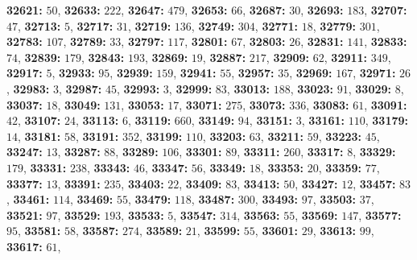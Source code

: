 \textsf{\bfseries 32621:} $50$, \textsf{\bfseries 32633:} $222$, \textsf{\bfseries 32647:} $479$, \textsf{\bfseries 32653:} $66$, \textsf{\bfseries 32687:} $30$, \textsf{\bfseries 32693:} $183$, \textsf{\bfseries 32707:} $47$, \textsf{\bfseries 32713:} $5$, \textsf{\bfseries 32717:} $31$, \textsf{\bfseries 32719:} $136$, \textsf{\bfseries 32749:} $304$, \textsf{\bfseries 32771:} $18$, \textsf{\bfseries 32779:} $301$, \textsf{\bfseries 32783:} $107$, \textsf{\bfseries 32789:} $33$, \textsf{\bfseries 32797:} $117$, \textsf{\bfseries 32801:} $67$, \textsf{\bfseries 32803:} $26$, \textsf{\bfseries 32831:} $141$, \textsf{\bfseries 32833:} $74$, \textsf{\bfseries 32839:} $179$, \textsf{\bfseries 32843:} $193$, \textsf{\bfseries 32869:} $19$, \textsf{\bfseries 32887:} $217$, \textsf{\bfseries 32909:} $62$, \textsf{\bfseries 32911:} $349$, \textsf{\bfseries 32917:} $5$, \textsf{\bfseries 32933:} $95$, \textsf{\bfseries 32939:} $159$, \textsf{\bfseries 32941:} $55$, \textsf{\bfseries 32957:} $35$, \textsf{\bfseries 32969:} $167$, \textsf{\bfseries 32971:} $26$, \textsf{\bfseries 32983:} $3$, \textsf{\bfseries 32987:} $45$, \textsf{\bfseries 32993:} $3$, \textsf{\bfseries 32999:} $83$, \textsf{\bfseries 33013:} $188$, \textsf{\bfseries 33023:} $91$, \textsf{\bfseries 33029:} $8$, \textsf{\bfseries 33037:} $18$, \textsf{\bfseries 33049:} $131$, \textsf{\bfseries 33053:} $17$, \textsf{\bfseries 33071:} $275$, \textsf{\bfseries 33073:} $336$, \textsf{\bfseries 33083:} $61$, \textsf{\bfseries 33091:} $42$, \textsf{\bfseries 33107:} $24$, \textsf{\bfseries 33113:} $6$, \textsf{\bfseries 33119:} $660$, \textsf{\bfseries 33149:} $94$, \textsf{\bfseries 33151:} $3$, \textsf{\bfseries 33161:} $110$, \textsf{\bfseries 33179:} $14$, \textsf{\bfseries 33181:} $58$, \textsf{\bfseries 33191:} $352$, \textsf{\bfseries 33199:} $110$, \textsf{\bfseries 33203:} $63$, \textsf{\bfseries 33211:} $59$, \textsf{\bfseries 33223:} $45$, \textsf{\bfseries 33247:} $13$, \textsf{\bfseries 33287:} $88$, \textsf{\bfseries 33289:} $106$, \textsf{\bfseries 33301:} $89$, \textsf{\bfseries 33311:} $260$, \textsf{\bfseries 33317:} $8$, \textsf{\bfseries 33329:} $179$, \textsf{\bfseries 33331:} $238$, \textsf{\bfseries 33343:} $46$, \textsf{\bfseries 33347:} $56$, \textsf{\bfseries 33349:} $18$, \textsf{\bfseries 33353:} $20$, \textsf{\bfseries 33359:} $77$, \textsf{\bfseries 33377:} $13$, \textsf{\bfseries 33391:} $235$, \textsf{\bfseries 33403:} $22$, \textsf{\bfseries 33409:} $83$, \textsf{\bfseries 33413:} $50$, \textsf{\bfseries 33427:} $12$, \textsf{\bfseries 33457:} $83$, \textsf{\bfseries 33461:} $114$, \textsf{\bfseries 33469:} $55$, \textsf{\bfseries 33479:} $118$, \textsf{\bfseries 33487:} $300$, \textsf{\bfseries 33493:} $97$, \textsf{\bfseries 33503:} $37$, \textsf{\bfseries 33521:} $97$, \textsf{\bfseries 33529:} $193$, \textsf{\bfseries 33533:} $5$, \textsf{\bfseries 33547:} $314$, \textsf{\bfseries 33563:} $55$, \textsf{\bfseries 33569:} $147$, \textsf{\bfseries 33577:} $95$, \textsf{\bfseries 33581:} $58$, \textsf{\bfseries 33587:} $274$, \textsf{\bfseries 33589:} $21$, \textsf{\bfseries 33599:} $55$, \textsf{\bfseries 33601:} $29$, \textsf{\bfseries 33613:} $99$, \textsf{\bfseries 33617:} $61$, 
